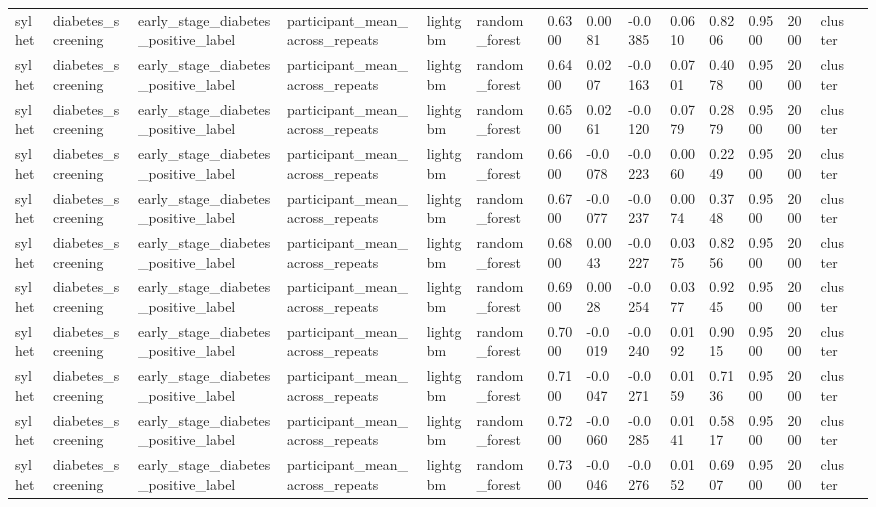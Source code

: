 \begin{tabular}{lllllllllllllll}
sylhet & diabetes\_screening & early\_stage\_diabetes\_positive\_label & participant\_mean\_across\_repeats & lightgbm & random\_forest & 0.6300 & 0.0081 & -0.0385 & 0.0610 & 0.8206 & 0.9500 & 2000 & cluster &  \\
sylhet & diabetes\_screening & early\_stage\_diabetes\_positive\_label & participant\_mean\_across\_repeats & lightgbm & random\_forest & 0.6400 & 0.0207 & -0.0163 & 0.0701 & 0.4078 & 0.9500 & 2000 & cluster &  \\
sylhet & diabetes\_screening & early\_stage\_diabetes\_positive\_label & participant\_mean\_across\_repeats & lightgbm & random\_forest & 0.6500 & 0.0261 & -0.0120 & 0.0779 & 0.2879 & 0.9500 & 2000 & cluster &  \\
sylhet & diabetes\_screening & early\_stage\_diabetes\_positive\_label & participant\_mean\_across\_repeats & lightgbm & random\_forest & 0.6600 & -0.0078 & -0.0223 & 0.0060 & 0.2249 & 0.9500 & 2000 & cluster &  \\
sylhet & diabetes\_screening & early\_stage\_diabetes\_positive\_label & participant\_mean\_across\_repeats & lightgbm & random\_forest & 0.6700 & -0.0077 & -0.0237 & 0.0074 & 0.3748 & 0.9500 & 2000 & cluster &  \\
sylhet & diabetes\_screening & early\_stage\_diabetes\_positive\_label & participant\_mean\_across\_repeats & lightgbm & random\_forest & 0.6800 & 0.0043 & -0.0227 & 0.0375 & 0.8256 & 0.9500 & 2000 & cluster &  \\
sylhet & diabetes\_screening & early\_stage\_diabetes\_positive\_label & participant\_mean\_across\_repeats & lightgbm & random\_forest & 0.6900 & 0.0028 & -0.0254 & 0.0377 & 0.9245 & 0.9500 & 2000 & cluster &  \\
sylhet & diabetes\_screening & early\_stage\_diabetes\_positive\_label & participant\_mean\_across\_repeats & lightgbm & random\_forest & 0.7000 & -0.0019 & -0.0240 & 0.0192 & 0.9015 & 0.9500 & 2000 & cluster &  \\
sylhet & diabetes\_screening & early\_stage\_diabetes\_positive\_label & participant\_mean\_across\_repeats & lightgbm & random\_forest & 0.7100 & -0.0047 & -0.0271 & 0.0159 & 0.7136 & 0.9500 & 2000 & cluster &  \\
sylhet & diabetes\_screening & early\_stage\_diabetes\_positive\_label & participant\_mean\_across\_repeats & lightgbm & random\_forest & 0.7200 & -0.0060 & -0.0285 & 0.0141 & 0.5817 & 0.9500 & 2000 & cluster &  \\
sylhet & diabetes\_screening & early\_stage\_diabetes\_positive\_label & participant\_mean\_across\_repeats & lightgbm & random\_forest & 0.7300 & -0.0046 & -0.0276 & 0.0152 & 0.6907 & 0.9500 & 2000 & cluster &  \\

\end{tabular}
